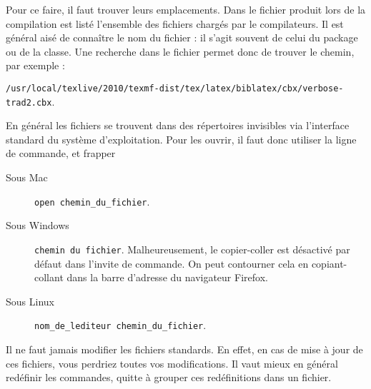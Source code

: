Pour ce faire, il faut trouver leurs emplacements. Dans le fichier  produit lors de la compilation est listé l'ensemble des fichiers chargés par le compilateurs. Il est général aisé de connaître le nom du fichier : il s'agit souvent de celui du package ou de la classe. Une recherche dans le fichier permet donc de trouver le chemin, par exemple : 

\verb|/usr/local/texlive/2010/texmf-dist/tex/latex/biblatex/cbx/verbose-trad2.cbx|.

En général les fichiers se trouvent dans des répertoires invisibles via l'interface standard du système d'exploitation. Pour les ouvrir, il faut donc utiliser la ligne de commande, et frapper 
\begin{description}
\item[Sous Mac]\verb|open chemin_du_fichier|.
\item[Sous Windows] \verb|chemin du fichier|.  Malheureusement, le copier-coller est désactivé par défaut dans l'invite de commande. On peut contourner cela en copiant-collant dans la barre d'adresse du navigateur Firefox.
\item[Sous Linux] \verb|nom_de_lediteur chemin_du_fichier|.
\end{description}
\begin{attention}
Il ne faut jamais modifier les fichiers standards. En effet, en cas de mise à jour de ces fichiers, vous perdriez toutes vos modifications. Il vaut mieux en général redéfinir les commandes, quitte à grouper ces redéfinitions dans un fichier.
\end{attention}


